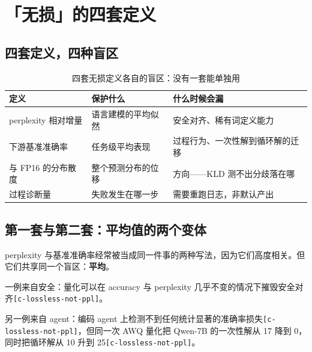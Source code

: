 \section{「无损」的四套定义}

\subsection{四套定义，四种盲区}

\begin{table}[t]
\centering
\footnotesize
\setlength{\tabcolsep}{4pt}
\caption{四套无损定义各自的盲区：没有一套能单独用}
\label{tab:2}
\begin{tabular}{lll}
\toprule
定义 & 保护什么 & 什么时候会漏 \\
\midrule
perplexity 相对增量 & 语言建模的平均似然 & 安全对齐、稀有词定义能力 \\
下游基准准确率 & 任务级平均表现 & 过程行为、一次性解到循环解的迁移 \\
与 FP16 的分布散度 & 整个预测分布的位移 & 方向——KLD 测不出分歧落在哪 \\
过程诊断量 & 失败发生在哪一步 & 需要重跑日志，非默认产出 \\
\bottomrule
\end{tabular}
\end{table}

\subsection{第一套与第二套：平均值的两个变体}

perplexity 与基准准确率经常被当成同一件事的两种写法，因为它们高度相关。但它们共享同一个盲区：\textbf{平均}。


一例来自安全：量化可以在 accuracy 与 perplexity 几乎不变的情况下摧毁安全对齐{\scriptsize\texttt{[c-\hspace{0pt}lossless-\hspace{0pt}not-\hspace{0pt}ppl]}}。


另一例来自 agent：编码 agent 上检测不到任何统计显著的准确率损失{\scriptsize\texttt{[c-\hspace{0pt}lossless-\hspace{0pt}not-\hspace{0pt}ppl]}}，但同一次 AWQ 量化把 Qwen-7B 的一次性解从 17 降到 0，同时把循环解从 10 升到 25{\scriptsize\texttt{[c-\hspace{0pt}lossless-\hspace{0pt}not-\hspace{0pt}ppl]}}。


